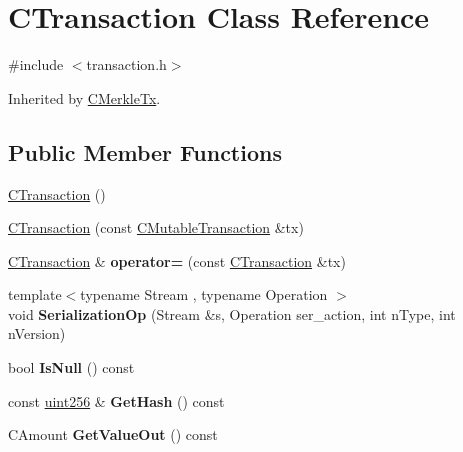 \hypertarget{class_c_transaction}{}\section{C\+Transaction Class Reference}
\label{class_c_transaction}


{\ttfamily \#include $<$transaction.\+h$>$}



Inherited by \mbox{\hyperlink{class_c_merkle_tx}{C\+Merkle\+Tx}}.

\subsection*{Public Member Functions}
\begin{DoxyCompactItemize}
\item 
\mbox{\hyperlink{class_c_transaction_a41717180530fca69eb0163c1024ae286}{C\+Transaction}} ()
\item 
\mbox{\hyperlink{class_c_transaction_a6607e95af3e2851ee3b7fe335a05eb4c}{C\+Transaction}} (const \mbox{\hyperlink{struct_c_mutable_transaction}{C\+Mutable\+Transaction}} \&tx)
\item 
\mbox{\label{class_c_transaction_a93a05df7088ebef96adb2ea0442380e8}} 
\mbox{\hyperlink{class_c_transaction}{C\+Transaction}} \& {\bfseries operator=} (const \mbox{\hyperlink{class_c_transaction}{C\+Transaction}} \&tx)
\item 
\mbox{\label{class_c_transaction_aa79659fab1e973a058494393209b0a59}} 
{\footnotesize template$<$typename Stream , typename Operation $>$ }\\void {\bfseries Serialization\+Op} (Stream \&s, Operation ser\+\_\+action, int n\+Type, int n\+Version)
\item 
\mbox{\label{class_c_transaction_a52965f371d2d3f723e88e60c8e68d6d0}} 
bool {\bfseries Is\+Null} () const
\item 
\mbox{\label{class_c_transaction_a7efd1379de830341417c0bfa23a149aa}} 
const \mbox{\hyperlink{classuint256}{uint256}} \& {\bfseries Get\+Hash} () const
\item 
\mbox{\label{class_c_transaction_aa4ce691dbb2ce32838d94d15801f6644}} 
C\+Amount {\bfseries Get\+Value\+Out} () const

\end{DoxyCompactItemize}

